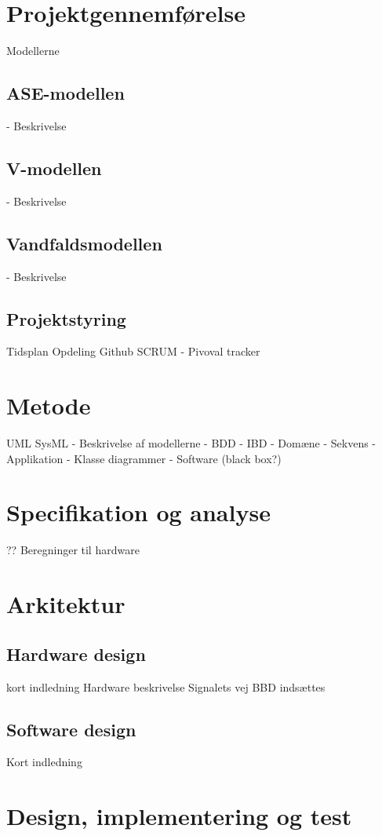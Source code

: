 \section{Projektgennemførelse}
Modellerne
\subsection{ASE-modellen}
- Beskrivelse
\subsection{V-modellen}
- Beskrivelse
\subsection{Vandfaldsmodellen}
- Beskrivelse
\subsection{Projektstyring}
Tidsplan
Opdeling
Github
SCRUM
- Pivoval tracker
\section{Metode}
UML
SysML
- Beskrivelse af modellerne
	- BDD
	- IBD
	- Domæne
	- Sekvens
	- Applikation
	- Klasse diagrammer
	- Software (black box?)
	
	
	
	\section{Specifikation og analyse}
	??
	Beregninger til hardware
	\section{Arkitektur}
	\subsection{Hardware design}
	kort indledning
	Hardware beskrivelse
	Signalets vej
	BBD indsættes
	\subsection{Software design}
	Kort indledning
	\section{Design, implementering og test}
	
	
	
